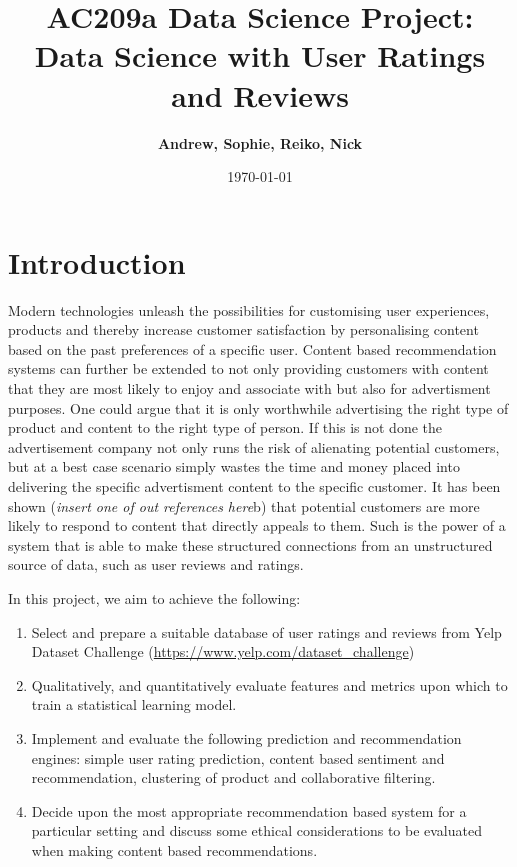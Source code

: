 \documentclass[11pt]{article}
\title{
\vspace{1in}
\textmd{\textbf{AC209a Data Science Project: Data Science with User Ratings and Reviews}}\\
\vspace{2cm}
}
\author{\textbf{Andrew, Sophie, Reiko, Nick}}
\date{\today} %
\begin{document}
\maketitle

\section*{Introduction}
	Modern technologies unleash the possibilities for customising user experiences, products and thereby increase customer satisfaction by personalising content
	based on the past preferences of a specific user. Content based recommendation systems can further be extended to not only providing customers with content that they are most likely to enjoy and associate with but also for advertisment purposes. One could argue that it is only worthwhile advertising the right type of product and content to the right type of person. If this is not done the advertisement company not only runs the risk of alienating potential customers, but at a best case scenario simply wastes the time and money placed into delivering the specific advertisment content to the specific customer. It has been shown (\textit{insert one of out references here}b) that potential customers are more likely to respond to content that directly appeals to them. Such is the power of a system that is able to make these structured connections from an unstructured source of data, such as user reviews and ratings.

	In this project, we aim to achieve the following:
	\begin{enumerate}
		\item Select and prepare a suitable database of user ratings and reviews from Yelp Dataset Challenge (\url{https://www.yelp.com/dataset_challenge})
		\item Qualitatively, and quantitatively evaluate features and metrics upon which to train a statistical learning model.
		\item Implement and evaluate the following prediction and recommendation engines: simple user rating prediction, content based sentiment and recommendation, clustering of product and collaborative filtering.
		\item Decide upon the most appropriate recommendation based system for a particular setting and discuss some ethical considerations to be evaluated when making content based recommendations.
	\end{enumerate}
\end{document}
